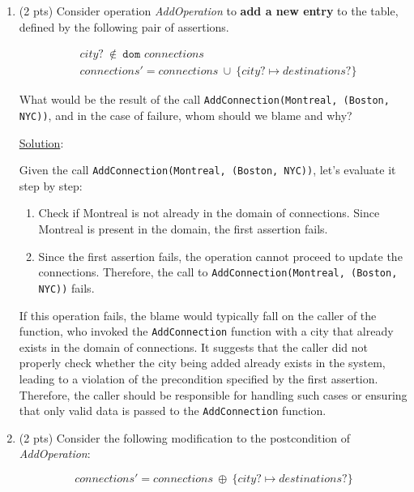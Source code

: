 \documentclass[12pt]{article}
\begin{document}
\begin{spacing}{1.5}
\begin{enumerate}
		\item (2 pts) Consider operation \textit{AddOperation} to \textbf{add a new entry} to the table, defined by the following pair of assertions.
		      		      
		      \begin{align*}
		      	  & city? \: \notin \: \texttt{dom } connections                          \\
		      	  & connections' = connections \: \cup \: \{city? \mapsto destinations?\} 
		      \end{align*}
		      		      
		      What would be the result of the call \texttt{AddConnection(Montreal, (Boston, NYC))}, and in the case of failure, whom should we blame and why?\newline
		      
		      \noindent \underline{Solution}:
		              
		      Given the call \texttt{AddConnection(Montreal, (Boston, NYC))}, let's evaluate it step by step:
		      
		      \begin{enumerate}
		      	\item Check if Montreal is not already in the domain of connections. Since Montreal is present in the domain, the first assertion fails.
		      	      
		      	\item Since the first assertion fails, the operation cannot proceed to update the connections. Therefore, the call to \texttt{AddConnection(Montreal, (Boston, NYC))} fails.
		      \end{enumerate}
		      
		      If this operation fails, the blame would typically fall on the caller of the function, who invoked the \texttt{AddConnection} function with a city that already exists in the domain of connections. It suggests that the caller did not properly check whether the city being added already exists in the system, leading to a violation of the precondition specified by the first assertion. Therefore, the caller should be responsible for handling such cases or ensuring that only valid data is passed to the \texttt{AddConnection} function.
		                  
		\item (2 pts) Consider the following modification to the postcondition of \textit{AddOperation}:
		      		      
		      $$connections'=connections \: \oplus \: \{city? \mapsto destinations?\}$$
		      		      

\end{enumerate}
\end{spacing}
\end{document}
